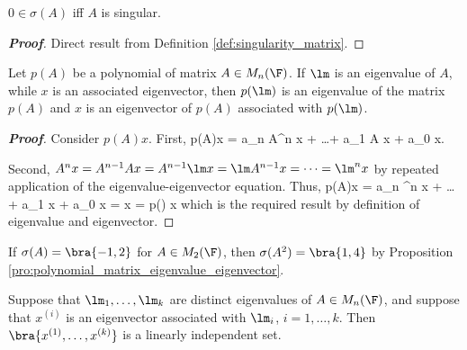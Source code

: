 \begin{proposition}\label{pro:zero_eigenvalue_singular_equivalent}
$0\in \sigma(A)$ iff $A$ is singular.
\end{proposition}

\begin{proof}[\bf Proof]
Direct result from Definition \ref{def:singularity_matrix}.
\end{proof}







\begin{proposition}\label{pro:polynomial_matrix_eigenvalue_eigenvector}
Let $p(A)$ be a polynomial of matrix $A\in M_n(\F)$. If $\lm$ is an eigenvalue of $A$, while $x$ is an associated eigenvector, then $p(\lm)$ is an eigenvalue of the matrix $p(A)$ and $x$ is an
eigenvector of $p(A)$ associated with $p(\lm)$.
\end{proposition}

\begin{proof}[\bf Proof]
Consider $p(A)x$. First,
\be
p(A)x = a_n A^n x + \dots + a_1 A x + a_0 x.
\ee

Second, $A^n x = A^{n-1}A x = A^{n-1}\lm x = \lm A^{n-1} x = \dots =\lm^n x$ by repeated application of the eigenvalue-eigenvector equation. Thus,
\be
p(A)x = a_n \lm^n x + \dots + a_1 \lm x + a_0 x = x = p(\lm) x
\ee
which is the required result by definition of eigenvalue and eigenvector.
\end{proof}

\begin{example}
If $\sigma(A) = \bra{-1,2}$ for $A\in M_2(\F)$, then $\sigma(A^2) = \bra{1,4}$ by Proposition \ref{pro:polynomial_matrix_eigenvalue_eigenvector}.
\end{example}


\begin{lemma}\label{lem:distinct_eigenvalues_implies_linearly_independent_eigenvectors}
Suppose that $\lm_1,\dots,\lm_k$ are distinct eigenvalues of $A\in M_n(\F)$, and suppose that $x^{(i)}$ is an eigenvector associated with $\lm_i$, $i=1,\dots,k$. Then $\bra{x^{(1)},\dots,x^{(k)}}$ is a
linearly independent set.
\end{lemma}

